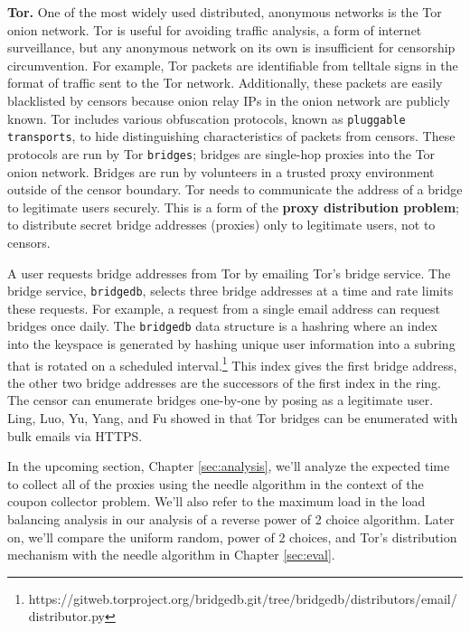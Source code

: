 \textbf{Tor.} One of the most widely used distributed, anonymous networks is the Tor onion network. Tor is useful for avoiding traffic analysis, a form of internet surveillance, but any anonymous network on its own is insufficient for censorship circumvention. For example, Tor packets are identifiable from telltale signs in the format of traffic sent to the Tor network. Additionally, these packets are easily blacklisted by censors because onion relay IPs in the onion network are publicly known. Tor includes various obfuscation protocols, known as \texttt{pluggable transports}, to hide distinguishing characteristics of packets from censors. These protocols are run by Tor \texttt{bridges}; bridges are single-hop proxies into the Tor onion network. Bridges are run by volunteers in a trusted proxy environment outside of the censor boundary. Tor needs to communicate the address of a bridge to legitimate users securely. This is a form of the \textbf{proxy distribution problem}; to distribute secret bridge addresses (proxies) only to legitimate users, not to censors. 

A user requests bridge addresses from Tor by emailing Tor's bridge service. The bridge service, \texttt{bridgedb}, selects three bridge addresses at a time and rate limits these requests. For example, a request from a single email address can request bridges once daily. The \texttt{bridgedb} data structure is a hashring where an index into the keyspace is generated by hashing unique user information into a subring that is rotated on a scheduled interval.\footnote{https://gitweb.torproject.org/bridgedb.git/tree/bridgedb/distributors/email/distributor.py} This index gives the first bridge address, the other two bridge addresses are the successors of the first index in the ring. The censor can enumerate bridges one-by-one by posing as a legitimate user. Ling, Luo, Yu, Yang, and Fu showed in \cite{ling2015tor} that Tor bridges can be enumerated with bulk emails via HTTPS.

In the upcoming section, Chapter \ref{sec:analysis}, we'll analyze the expected time to collect all of the proxies using the needle algorithm in the context of the coupon collector problem. We'll also refer to the maximum load in the load balancing analysis in our analysis of a reverse power of 2 choice algorithm. Later on, we'll compare the uniform random, power of 2 choices, and Tor's distribution mechanism with the needle algorithm in Chapter \ref{sec:eval}.